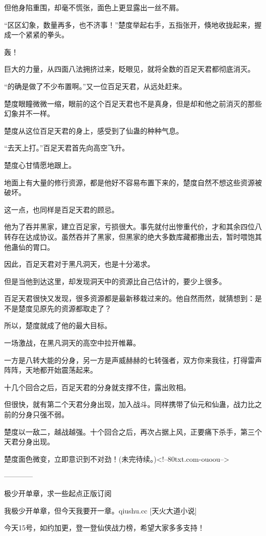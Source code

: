 \begin{this_body}
但他身陷重围，却毫不慌张，面色上更显露出一丝不屑。

“区区幻象，数量再多，也不济事！”楚度举起右手，五指张开，倏地收拢起来，握成一个紧紧的拳头。

轰！

巨大的力量，从四面八法拥挤过来，眨眼见，就将全数的百足天君都彻底消灭。

“的确是做了不少布置啊。”又一位百足天君，从远处赶来。

楚度眼瞳微微一缩，眼前的这个百足天君也不是真身，但是却和他之前消灭的那些幻象并不一样。

楚度从这位百足天君的身上，感受到了仙蛊的种种气息。

“去天上打。”百足天君首先向高空飞升。

楚度心甘情愿地跟上。

地面上有大量的修行资源，都是他好不容易布置下来的，楚度自然不想这些资源被破坏。

这一点，也同样是百足天君的顾忌。

他为了吞并黑家，建立百足家，亏损很大。事先就付出惨重代价，才和其余四位八转存在达成协议。虽然吞并了黑家，但黑家的绝大多数库藏都撒出去，暂时喂饱其他蛊仙的胃口。

因此，百足天君对于黑凡洞天，也是十分渴求。

但是当他到达这里，却发现洞天中的资源比自己估计的，要少上很多。

百足天君很快又发现，很多资源都是最新移栽过来的。他自然而然，就猜想到：是不是楚度见原先的资源都取走了？

所以，楚度就成了他的最大目标。

一场激战，在黑凡洞天的高空中拉开帷幕。

一方是八转大能的分身，另一方是声威赫赫的七转强者，双方你来我往，打得雷声阵阵，天地都开始震荡起来。

十几个回合之后，百足天君的分身就支撑不住，露出败相。

但很快，就有第二个天君分身出现，加入战斗。同样携带了仙元和仙蛊，战力比之前的分身只强不弱。

楚度以一敌二，越战越强。十个回合之后，再次占据上风，正要痛下杀手，第三个天君分身出现。

楚度面色微变，立即意识到不对劲！(未完待续。)<!--80txt.com-ouoou-->

------------

极少开单章，求一些起点正版订阅

我极少开单章，但今天我要开一章。qiushu.cc [天火大道小说]

今天15号，如约加更，登一登仙侠战力榜，希望大家多多支持！


\end{this_body}

